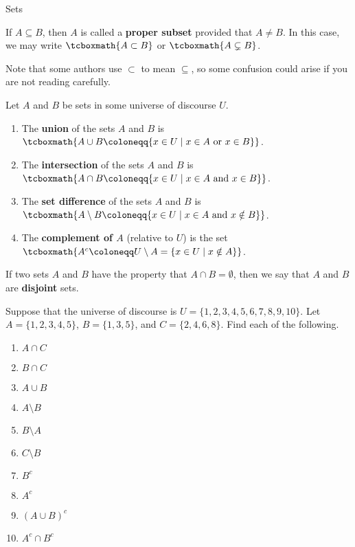 \begin{section}{Sets}
\begin{definition}
If $A\subseteq B$, then $A$ is called a \textbf{proper subset} provided that $A\neq B$.  In this case, we may write $\tcboxmath{A\subset B}$ or $\tcboxmath{A\subsetneq B}$.
\end{definition}

Note that some authors use $\subset$ to mean $\subseteq$, so some confusion could arise if you are not reading carefully.

\begin{definition}
Let $A$ and $B$ be sets in some universe of discourse $U$.
\begin{enumerate}[label=\textrm{(\alph*)}]
\item The \textbf{union} of the sets $A$ and $B$ is $\tcboxmath{A \cup B \coloneqq \{x\in U \mid x\in A \mbox{ or } x\in B \}}$.
\item The \textbf{intersection} of the sets $A$ and $B$ is $\tcboxmath{A \cap B \coloneqq\{x\in U \mid x\in A \mbox{ and } x\in B \}}$.
\item The \textbf{set difference} of the sets $A$ and $B$ is $\tcboxmath{A \setminus B \coloneqq\{x\in U \mid x\in A \mbox{ and } x\notin B \}}$.
\item The \textbf{complement of $A$} (relative to $U$) is the set $\tcboxmath{A^c\coloneqq U \setminus A =\{x \in U \mid x \notin A\}}$.
\end{enumerate}
\end{definition}

\begin{definition}
If two sets $A$ and $B$ have the property that $A \cap B = \emptyset$, then we say that $A$ and $B$ are \textbf{disjoint} sets.
\end{definition}

\begin{problem}
Suppose that the universe of discourse is $U=\{1,2,3,4,5,6,7,8,9,10\}$.  Let $A=\{1, 2, 3, 4, 5\}$, $B=\{1, 3, 5\}$, and $C=\{2, 4, 6, 8\}$.  Find each of the following.
\begin{multicols}{2}
\begin{enumerate}[label=\textrm{(\alph*)}]
\item $A \cap C$
\item $B \cap C$
\item $A \cup B$
\item $A\setminus B$
\item $B \setminus A$
\item $C \setminus B$
\item $B^c$
\item $A^c$
\item $(A\cup B)^c$
\item $A^c\cap B^c$
\end{enumerate}
\end{multicols}
\end{problem}


\end{section}
